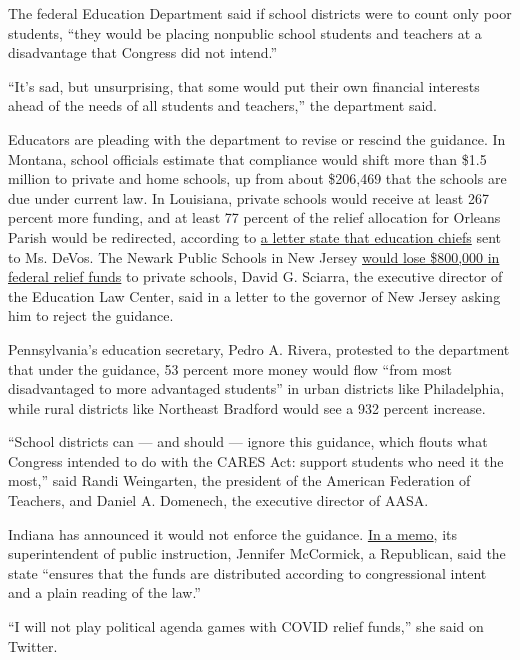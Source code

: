The federal Education Department said if school districts were to count
only poor students, ``they would be placing nonpublic school students
and teachers at a disadvantage that Congress did not intend.''

``It's sad, but unsurprising, that some would put their own financial
interests ahead of the needs of all students and teachers,'' the
department said.

Educators are pleading with the department to revise or rescind the
guidance. In Montana, school officials estimate that compliance would
shift more than \$1.5 million to private and home schools, up from about
\$206,469 that the schools are due under current law. In Louisiana,
private schools would receive at least 267 percent more funding, and at
least 77 percent of the relief allocation for Orleans Parish would be
redirected, according to
\href{https://ccsso.org/sites/default/files/2020-05/DeVosESLetter050520.pdf}{a
letter state that education chiefs} sent to Ms. DeVos. The Newark Public
Schools in New Jersey
\href{https://edlawcenter.org/assets/files/pdfs/School\%20Funding/ELC_Letter_to_Governor_Murphy_re.pdf}{would
lose \$800,000 in federal relief funds} to private schools, David G.
Sciarra, the executive director of the Education Law Center, said in a
letter to the governor of New Jersey asking him to reject the guidance.

Pennsylvania's education secretary, Pedro A. Rivera, protested to the
department that under the guidance, 53 percent more money would flow
``from most disadvantaged to more advantaged students'' in urban
districts like Philadelphia, while rural districts like Northeast
Bradford would see a 932 percent increase.

``School districts can --- and should --- ignore this guidance, which
flouts what Congress intended to do with the CARES Act: support students
who need it the most,'' said Randi Weingarten, the president of the
American Federation of Teachers, and Daniel A. Domenech, the executive
director of AASA.

Indiana has announced it would not enforce the guidance.
\href{https://www.doe.in.gov/sites/default/files/grants/final-language-equitable-share-cares-51220.pdf}{In
a memo}, its superintendent of public instruction, Jennifer McCormick, a
Republican, said the state ``ensures that the funds are distributed
according to congressional intent and a plain reading of the law.''

``I will not play political agenda games with COVID relief funds,'' she
said on Twitter.

